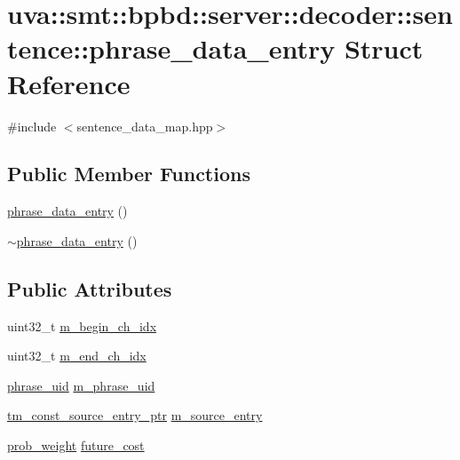\hypertarget{structuva_1_1smt_1_1bpbd_1_1server_1_1decoder_1_1sentence_1_1phrase__data__entry}{}\section{uva\+:\+:smt\+:\+:bpbd\+:\+:server\+:\+:decoder\+:\+:sentence\+:\+:phrase\+\_\+data\+\_\+entry Struct Reference}
\label{structuva_1_1smt_1_1bpbd_1_1server_1_1decoder_1_1sentence_1_1phrase__data__entry}


{\ttfamily \#include $<$sentence\+\_\+data\+\_\+map.\+hpp$>$}

\subsection*{Public Member Functions}
\begin{DoxyCompactItemize}
\item 
\hyperlink{structuva_1_1smt_1_1bpbd_1_1server_1_1decoder_1_1sentence_1_1phrase__data__entry_a74c15d9fa0aa346bf817ac57d7dca8cb}{phrase\+\_\+data\+\_\+entry} ()
\item 
\hyperlink{structuva_1_1smt_1_1bpbd_1_1server_1_1decoder_1_1sentence_1_1phrase__data__entry_a2be902b91181b797fc8bda46f0b6ffdb}{$\sim$phrase\+\_\+data\+\_\+entry} ()
\end{DoxyCompactItemize}
\subsection*{Public Attributes}
\begin{DoxyCompactItemize}
\item 
uint32\+\_\+t \hyperlink{structuva_1_1smt_1_1bpbd_1_1server_1_1decoder_1_1sentence_1_1phrase__data__entry_af1dcb3cbf1a48848495b72ba5e2229cd}{m\+\_\+begin\+\_\+ch\+\_\+idx}
\item 
uint32\+\_\+t \hyperlink{structuva_1_1smt_1_1bpbd_1_1server_1_1decoder_1_1sentence_1_1phrase__data__entry_aa83a98923844d4a3a618fefbf6bf815f}{m\+\_\+end\+\_\+ch\+\_\+idx}
\item 
\hyperlink{namespaceuva_1_1smt_1_1bpbd_1_1server_ad18d4cdf5504e76c22b0c124ff60b44f}{phrase\+\_\+uid} \hyperlink{structuva_1_1smt_1_1bpbd_1_1server_1_1decoder_1_1sentence_1_1phrase__data__entry_abfdf7904b3f26622c2ac3701e6e08669}{m\+\_\+phrase\+\_\+uid}
\item 
\hyperlink{namespaceuva_1_1smt_1_1bpbd_1_1server_1_1tm_1_1models_a841bb11e4e9f70fbde7a8ca1ae533681}{tm\+\_\+const\+\_\+source\+\_\+entry\+\_\+ptr} \hyperlink{structuva_1_1smt_1_1bpbd_1_1server_1_1decoder_1_1sentence_1_1phrase__data__entry_a4ae9bf3a78f729718c5b2d992060b092}{m\+\_\+source\+\_\+entry}
\item 
\hyperlink{namespaceuva_1_1smt_1_1bpbd_1_1server_a01e9ea4de9c226f4464862e84ff0bbcc}{prob\+\_\+weight} \hyperlink{structuva_1_1smt_1_1bpbd_1_1server_1_1decoder_1_1sentence_1_1phrase__data__entry_a4f8a9d2d6cd52387658a318682e0c596}{future\+\_\+cost}
\end{DoxyCompactItemize}


